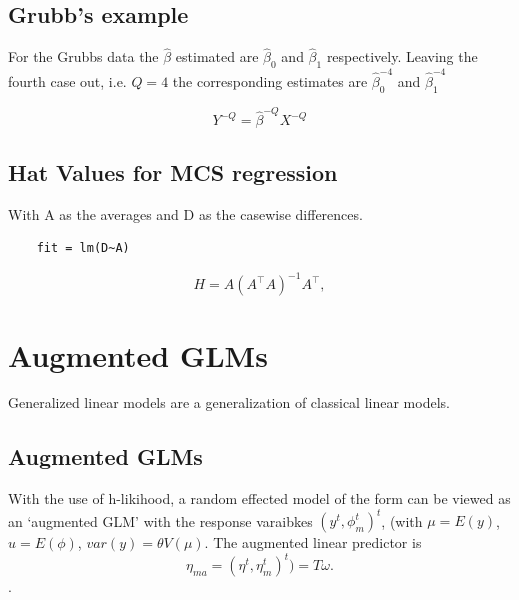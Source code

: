 \documentclass[12pt, a4paper]{report}
\theoremstyle{plain}
\theoremstyle{definition}
\theoremstyle{remark}
\begin{document}
	\section{Grubb's example}
	For the Grubbs data the $\hat{\beta}$ estimated are $\hat{\beta}_{0}$ and $\hat{\beta}_{1}$ respectively. Leaving the
	fourth case out, i.e. $Q=4$ the corresponding estimates are $\hat{\beta}_{0}^{-4}$ and $\hat{\beta}_{1}^{-4}$
	
	\begin{equation}
	Y^{-Q} = \hat{\beta}^{-Q}X^{-Q}
	\end{equation}
	
	
	
	
	\section{Hat Values for MCS regression}
	
	With A as the averages and D as the casewise differences.
	\begin{verbatim}
	fit = lm(D~A)
	\end{verbatim}
	
	\begin{displaymath}
	H = A \left(A^\top  A\right)^{-1} A^\top ,
	\end{displaymath}
	
	\chapter{Augmented GLMs} 
	
	
	
	
	Generalized linear models are a generalization of classical linear  models.
	
	\section{Augmented GLMs} %
	
	With the use of h-likihood, a random effected model of the form can be viewed as an `augmented GLM' with the response varaibkes $(y^t, \phi^t_m)^t$, (with $\mu = E(y)$,$ u = E(\phi)$, $var(y) = \theta V (\mu)$.
	The augmented linear predictor is \[\eta_{ma}  = (\eta^t, \eta^t_m)^t) = T\omega. \].
	
	
	
	
\end{document}
